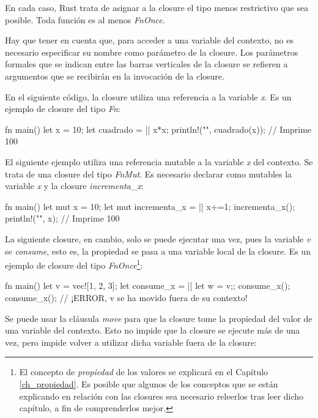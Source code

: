 En cada caso, Rust trata de asignar a la closure el tipo menos restrictivo que sea posible. Toda función es al menos \textit{FnOnce}. 

Hay que tener en cuenta que, para acceder a una variable del contexto, no es necesario especificar su nombre como parámetro de la closure. Los parámetros formales que se indican entre las barras verticales de la closure se refieren a argumentos que se recibirán en la invocación de la closure.

En el siguiente código, la closure utiliza una referencia a la variable \textit{x}. Es un ejemplo de closure del tipo \textit{Fn}:

\vspace{0.7em}
\begin{Codigo}
fn main() {
   let x = 10;
   let cuadrado = || {x*x};
   println!("{}", cuadrado(x)); // Imprime 100
}
\end{Codigo}

El siguiente ejemplo utiliza una referencia mutable a la variable \textit{x} del contexto. Se trata de una closure del tipo \textit{FnMut}. Es necesario declarar como mutables la variable \textit{x} y la closure \textit{incrementa\_x}:

\vspace{0.7em}
\begin{Codigo}
fn main() {
   let mut x = 10;
   let mut incrementa_x = || x+=1;
   incrementa_x();
   println!("{}", x); // Imprime 100
}
\end{Codigo}

La siguiente closure, en cambio, solo se puede ejecutar una vez, pues la variable \textit{v} se \textit{consume}, esto es, la propiedad se pasa a una variable local de la closure. Es un ejemplo de closure del tipo \textit{FnOnce}\footnote{El concepto de \textit{propiedad} de los valores se explicará en el Capítulo \ref{ch_propiedad}. Es posible que algunos de los conceptos que se están explicando en relación con las closures sea necesario releerlos tras leer dicho capítulo, a fin de comprenderlos mejor.}:

\vspace{0.7em}
\begin{Codigo}
fn main() {
   let v = vec![1, 2, 3];
   let consume_x =  || {let w = v;};
   consume_x();
   consume_x(); // ¡ERROR, v se ha movido fuera de su contexto!
}
\end{Codigo}

Se puede usar la cláusula \textit{move} para que la closure tome la propiedad del valor de una variable del contexto. Esto no impide que la closure se ejecute más de una vez, pero impide volver a utilizar dicha variable fuera de la closure:

